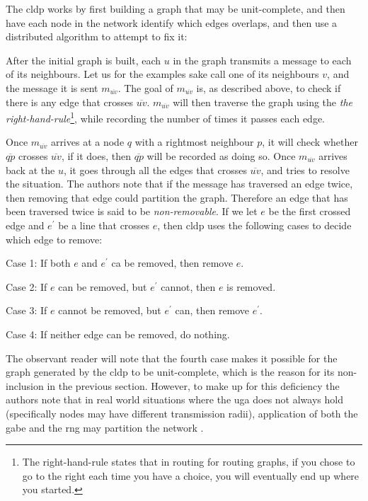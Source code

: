 The \ac{cldp} works by first building a graph that may be unit-complete, and then have each node in the network identify which edges overlaps, and then use a distributed algorithm to attempt to fix it:

After the initial graph is built, each $u$ in the graph transmits a message to each of its neighbours. Let us for the examples sake call one of its neighbours $v$, and the message it is sent $m_{\overline{uv}}$. The goal of $m_{\overline{uv}}$ is, as described above, to check if there is any edge that crosses $\overline{uv}$. $m_{\overline{uv}}$ will then traverse the graph using the \label{right-hand-rule} \emph{the right-hand-rule}\footnote{The right-hand-rule states that in routing for routing graphs, if you chose to go to the right each time you have a choice, you will eventually end up where you started.}, while recording the number of times it passes each edge.

Once $m_{\overline{uv}}$ arrives at a node $q$ with a rightmost neighbour $p$, it will check whether $\overline{qp}$ crosses $\overline{uv}$, if it does, then $\overline{qp}$ will be recorded as doing so. Once $m_{\overline{uv}}$ arrives back at the $u$, it goes through all the edges that crosses $\overline{uv}$, and tries to resolve the situation. The authors note that if the message has traversed an edge twice, then removing that edge could partition the graph. Therefore an edge that has been traversed twice is said to be \emph{non-removable}. If we let $e$ be the first crossed edge and $e^{\prime}$ be a line that crosses $e$, then \ac{cldp} uses the following cases to decide which edge to remove:
\begin{description}
\item{Case 1:} If both $e$ and $e^{\prime}$ ca be removed, then remove $e$.
\item{Case 2:} If $e$ can be removed, but $e^{\prime}$ cannot, then $e$ is removed.
\item{Case 3:} If $e$ cannot be removed, but $e^{\prime}$ can, then remove $e^{\prime}$.
\item{Case 4:} If neither edge can be removed, do nothing. 
\end{description}

The observant reader will note that the fourth case makes it possible for the graph generated by the \ac{cldp} to be unit-complete, which is the reason for its non-inclusion in the previous section. However, to make up for this deficiency the authors note that in real world situations where the \ac{uga} does not always hold (specifically nodes may have different transmission radii), application of both the \ac{gabe} and the \ac{rng} may partition the network \cite{practical}. 

